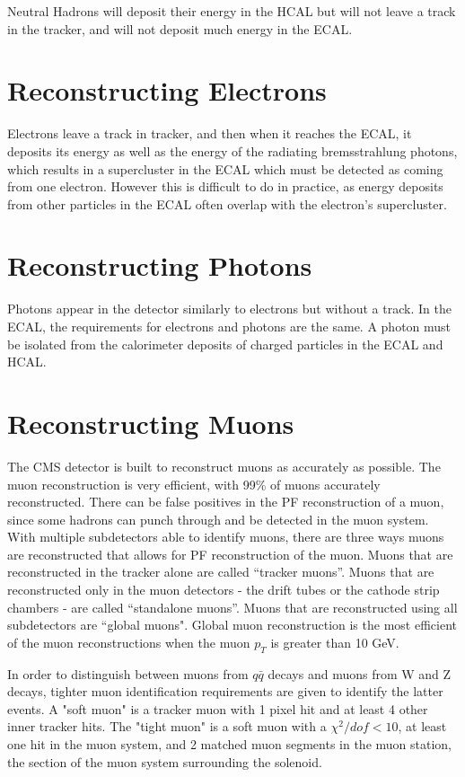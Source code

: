 Neutral Hadrons will deposit their energy in the HCAL but will not leave a track in the tracker, and will not deposit much energy in the ECAL.




\section{Reconstructing Electrons}

Electrons leave a track in tracker, and then when it reaches the ECAL, it deposits its energy as well as the energy of the radiating bremsstrahlung photons, which results in a supercluster in the ECAL which must be detected as coming from one electron. However this is difficult to do in practice, as energy deposits from other particles in the ECAL often overlap with the electron’s supercluster.


\section{Reconstructing Photons}

Photons appear in the detector similarly to electrons but without a track. In the ECAL, the requirements for electrons and photons are the same. A photon must be isolated from the calorimeter deposits of charged particles in the ECAL and HCAL.

\section{Reconstructing Muons}

The CMS detector is built to reconstruct muons as accurately as possible. The muon reconstruction is very efficient, with 99\% of muons accurately reconstructed. There can be false positives in the PF reconstruction of a muon, since some hadrons can punch through and be detected in the muon system. With multiple subdetectors able to identify muons, there are three ways muons are reconstructed that allows for PF reconstruction of the muon. Muons that are reconstructed in the tracker alone are called “tracker muons”. Muons that are reconstructed only in the muon detectors - the drift tubes or the cathode strip chambers - are called “standalone muons”. Muons that are reconstructed using all subdetectors are “global muons". Global muon reconstruction is the most efficient of the muon reconstructions when the muon $p_T$ is greater than 10 GeV.

In order to distinguish between muons from $q\bar{q}$ decays and muons from W and Z decays, tighter muon identification requirements are given to identify the latter events. A "soft muon" is a tracker muon with 1 pixel hit and at least 4 other inner tracker hits. The "tight muon" is a soft muon with a $\chi^2/dof < 10$, at least one hit in the muon system, and 2 matched muon segments in the muon station, the section of the muon system surrounding the solenoid.


